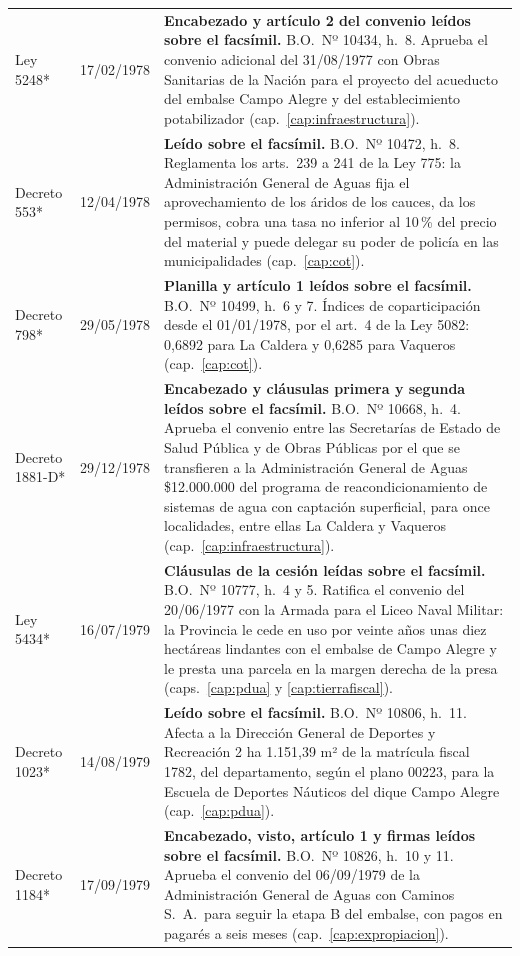 \begin{longtable}{@{}p{3.2cm}p{1.9cm}p{7.9cm}@{}}
Ley 5248* & 17/02/1978 & \textbf{Encabezado y artículo 2 del convenio leídos sobre el facsímil.} B.O.\ Nº 10434, h.\ 8. Aprueba el convenio adicional del 31/08/1977 con Obras Sanitarias de la Nación para el proyecto del acueducto del embalse Campo Alegre y del establecimiento potabilizador (cap.\ \ref{cap:infraestructura}). \\
Decreto 553* & 12/04/1978 & \textbf{Leído sobre el facsímil.} B.O.\ Nº 10472, h.\ 8. Reglamenta los arts.\ 239 a 241 de la Ley 775: la Administración General de Aguas fija el aprovechamiento de los áridos de los cauces, da los permisos, cobra una tasa no inferior al 10\,\% del precio del material y puede delegar su poder de policía en las municipalidades (cap.\ \ref{cap:cot}). \\
Decreto 798* & 29/05/1978 & \textbf{Planilla y artículo 1 leídos sobre el facsímil.} B.O.\ Nº 10499, h.\ 6 y 7. Índices de coparticipación desde el 01/01/1978, por el art.\ 4 de la Ley 5082: 0,6892 para La Caldera y 0,6285 para Vaqueros (cap.\ \ref{cap:cot}). \\
Decreto 1881-D* & 29/12/1978 & \textbf{Encabezado y cláusulas primera y segunda leídos sobre el facsímil.} B.O.\ Nº 10668, h.\ 4. Aprueba el convenio entre las Secretarías de Estado de Salud Pública y de Obras Públicas por el que se transfieren a la Administración General de Aguas \$12.000.000 del programa de reacondicionamiento de sistemas de agua con captación superficial, para once localidades, entre ellas La Caldera y Vaqueros (cap.\ \ref{cap:infraestructura}). \\
Ley 5434* & 16/07/1979 & \textbf{Cláusulas de la cesión leídas sobre el facsímil.} B.O.\ Nº 10777, h.\ 4 y 5. Ratifica el convenio del 20/06/1977 con la Armada para el Liceo Naval Militar: la Provincia le cede en uso por veinte años unas diez hectáreas lindantes con el embalse de Campo Alegre y le presta una parcela en la margen derecha de la presa (caps.\ \ref{cap:pdua} y \ref{cap:tierrafiscal}). \\
Decreto 1023* & 14/08/1979 & \textbf{Leído sobre el facsímil.} B.O.\ Nº 10806, h.\ 11. Afecta a la Dirección General de Deportes y Recreación 2 ha 1.151,39 m² de la matrícula fiscal 1782, del departamento, según el plano 00223, para la Escuela de Deportes Náuticos del dique Campo Alegre (cap.\ \ref{cap:pdua}). \\
Decreto 1184* & 17/09/1979 & \textbf{Encabezado, visto, artículo 1 y firmas leídos sobre el facsímil.} B.O.\ Nº 10826, h.\ 10 y 11. Aprueba el convenio del 06/09/1979 de la Administración General de Aguas con Caminos S.\ A.\ para seguir la etapa B del embalse, con pagos en pagarés a seis meses (cap.\ \ref{cap:expropiacion}). \\

\end{longtable}
